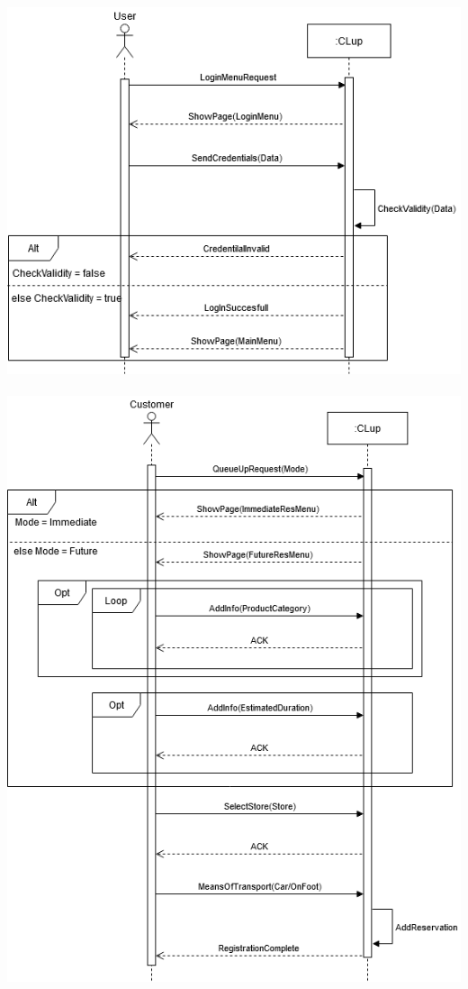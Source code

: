 \includegraphics[scale=0.5]{Images/UseCase3Diagram.png}\\\\
\includegraphics[scale=0.5]{Images/UseCase4Diagram.png}\\\\
